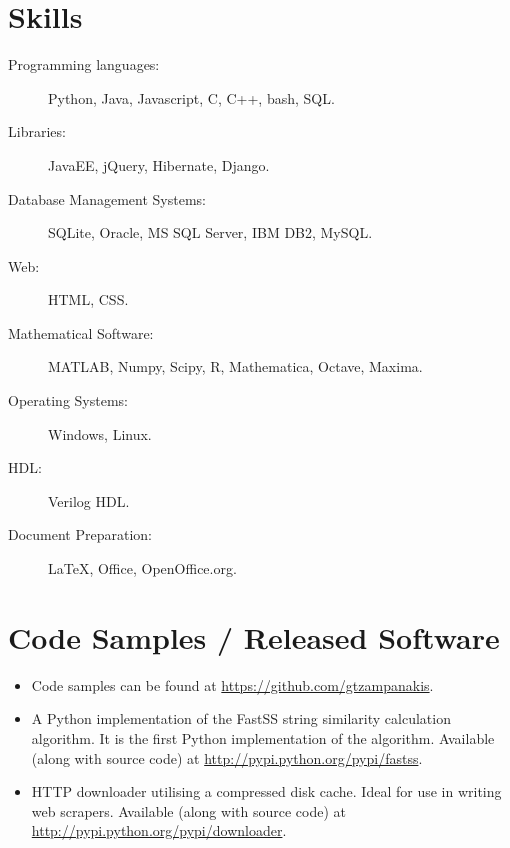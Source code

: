 \documentclass [a4paper,11pt]{article}
\begin{document}
	\section* {Skills}
		\begin {description}
			\item [Programming languages:] Python, Java, Javascript, C, C++, bash, SQL.
			\item [Libraries:] JavaEE, jQuery, Hibernate, Django.
			\item [Database Management Systems:] SQLite, Oracle, MS SQL Server, IBM DB2, MySQL.
			\item [Web:] HTML, CSS.
			\item [Mathematical Software:] MATLAB, Numpy, Scipy, R, Mathematica, Octave, Maxima.
			\item [Operating Systems:] Windows, Linux.
			\item [HDL:] Verilog HDL.
			\item [Document Preparation:] \LaTeX , Office, OpenOffice.org.
		\end {description}


	\section* {Code Samples / Released Software}
		\begin {itemize}

			\item Code samples can be found at \url{https://github.com/gtzampanakis}.

			\item A Python implementation of the FastSS string similarity
			calculation algorithm. It is the first Python implementation of the
			algorithm. Available (along with source code) at
			\url{http://pypi.python.org/pypi/fastss}.

			\item HTTP downloader utilising a compressed disk cache. Ideal for
			use in writing web scrapers. Available (along with source code) at
			\url{http://pypi.python.org/pypi/downloader}.

		\end {itemize}
\end{document}
